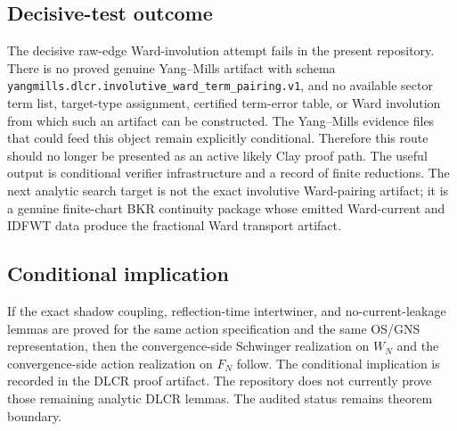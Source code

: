 \subsection{Decisive-test outcome}
The decisive raw-edge Ward-involution attempt fails in the present repository.
There is no proved genuine Yang--Mills artifact with schema
\texttt{yangmills.dlcr.involutive\_ward\_term\_pairing.v1}, and no available
sector term list, target-type assignment, certified term-error table, or Ward
involution from which such an artifact can be constructed. The Yang--Mills
evidence files that could feed this object remain explicitly conditional.
Therefore this route should no longer be presented as an active likely Clay
proof path. The useful output is conditional verifier infrastructure and a
record of finite reductions. The next analytic search target is not the
exact involutive Ward-pairing artifact; it is a genuine finite-chart BKR
continuity package whose emitted Ward-current and IDFWT data produce the
fractional Ward transport artifact.

\subsection{Conditional implication}
If the exact shadow coupling, reflection-time intertwiner, and
no-current-leakage lemmas are proved for the same action specification and the
same OS/GNS representation, then the convergence-side Schwinger realization on
$W_N$ and the convergence-side action realization on $F_N$ follow. The
conditional implication is recorded in the DLCR proof artifact. The repository
does not currently prove those remaining analytic DLCR lemmas. The audited status remains theorem boundary.
\endinput
